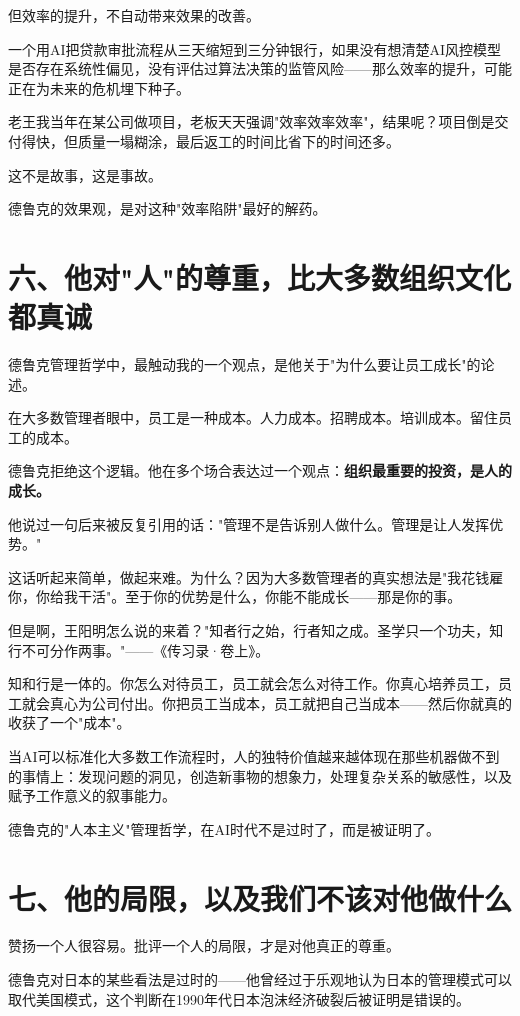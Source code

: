 但效率的提升，不自动带来效果的改善。

一个用AI把贷款审批流程从三天缩短到三分钟银行，如果没有想清楚AI风控模型是否存在系统性偏见，没有评估过算法决策的监管风险——那么效率的提升，可能正在为未来的危机埋下种子。

老王我当年在某公司做项目，老板天天强调"效率效率效率"，结果呢？项目倒是交付得快，但质量一塌糊涂，最后返工的时间比省下的时间还多。

这不是故事，这是事故。

德鲁克的效果观，是对这种"效率陷阱"最好的解药。


\section{六、他对"人"的尊重，比大多数组织文化都真诚}


德鲁克管理哲学中，最触动我的一个观点，是他关于"为什么要让员工成长"的论述。

在大多数管理者眼中，员工是一种成本。人力成本。招聘成本。培训成本。留住员工的成本。

德鲁克拒绝这个逻辑。他在多个场合表达过一个观点：\textbf{组织最重要的投资，是人的成长。}

他说过一句后来被反复引用的话："管理不是告诉别人做什么。管理是让人发挥优势。"

这话听起来简单，做起来难。为什么？因为大多数管理者的真实想法是"我花钱雇你，你给我干活"。至于你的优势是什么，你能不能成长——那是你的事。

但是啊，王阳明怎么说的来着？"知者行之始，行者知之成。圣学只一个功夫，知行不可分作两事。"——《传习录·卷上》。

知和行是一体的。你怎么对待员工，员工就会怎么对待工作。你真心培养员工，员工就会真心为公司付出。你把员工当成本，员工就把自己当成本——然后你就真的收获了一个"成本"。

当AI可以标准化大多数工作流程时，人的独特价值越来越体现在那些机器做不到的事情上：发现问题的洞见，创造新事物的想象力，处理复杂关系的敏感性，以及赋予工作意义的叙事能力。

德鲁克的"人本主义"管理哲学，在AI时代不是过时了，而是被证明了。


\section{七、他的局限，以及我们不该对他做什么}


赞扬一个人很容易。批评一个人的局限，才是对他真正的尊重。

德鲁克对日本的某些看法是过时的——他曾经过于乐观地认为日本的管理模式可以取代美国模式，这个判断在1990年代日本泡沫经济破裂后被证明是错误的。

